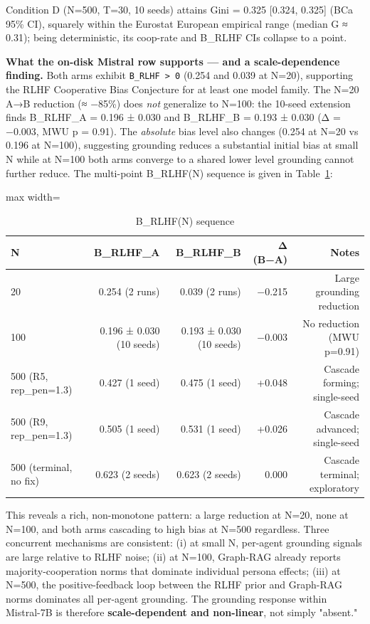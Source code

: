 Condition D (N=500, T=30, 10 seeds) attains Gini = 0.325 [0.324, 0.325] (BCa 95\% CI), squarely within the Eurostat European empirical range (median G ≈ 0.31); being deterministic, its coop-rate and B\_RLHF CIs collapse to a point.

\textbf{What the on-disk Mistral row supports — and a scale-dependence finding.} Both arms exhibit \texttt{B\_RLHF > 0} (0.254 and 0.039 at N=20), supporting the RLHF Cooperative Bias Conjecture for at least one model family. The N=20 A→B reduction (≈ −85\%) does \textit{not} generalize to N=100: the 10-seed extension finds B\_RLHF\_A = 0.196 ± 0.030 and B\_RLHF\_B = 0.193 ± 0.030 (Δ = −0.003, MWU p = 0.91). The \textit{absolute} bias level also changes (0.254 at N=20 vs 0.196 at N=100), suggesting grounding reduces a substantial initial bias at small N while at N=100 both arms converge to a shared lower level grounding cannot further reduce. The multi-point B\_RLHF(N) sequence is given in Table~\ref{tab:7}:


\begin{table}[H]
\centering
\caption{B\_RLHF(N) sequence}
\label{tab:7}
\footnotesize
\begin{adjustbox}{max width=\textwidth}
\begin{tabular}{lrrrr}
\toprule
N & B\_RLHF\_A & B\_RLHF\_B & Δ (B−A) & Notes \\
\midrule
20 & 0.254 (2 runs) & 0.039 (2 runs) & −0.215 & Large grounding reduction \\
100 & 0.196 ± 0.030 (10 seeds) & 0.193 ± 0.030 (10 seeds) & −0.003 & No reduction (MWU p=0.91) \\
500 (R5, rep\_pen=1.3) & 0.427 (1 seed) & 0.475 (1 seed) & +0.048 & Cascade forming; single-seed \\
500 (R9, rep\_pen=1.3) & 0.505 (1 seed) & 0.531 (1 seed) & +0.026 & Cascade advanced; single-seed \\
500 (terminal, no fix) & 0.623 (2 seeds) & 0.623 (2 seeds) & 0.000 & Cascade terminal; exploratory \\
\bottomrule
\end{tabular}
\end{adjustbox}
\end{table}

This reveals a rich, non-monotone pattern: a large reduction at N=20, none at N=100, and both arms cascading to high bias at N=500 regardless. Three concurrent mechanisms are consistent: (i) at small N, per-agent grounding signals are large relative to RLHF noise; (ii) at N=100, Graph-RAG already reports majority-cooperation norms that dominate individual persona effects; (iii) at N=500, the positive-feedback loop between the RLHF prior and Graph-RAG norms dominates all per-agent grounding. The grounding response within Mistral-7B is therefore \textbf{scale-dependent and non-linear}, not simply "absent."

